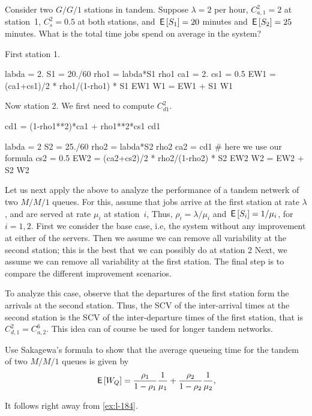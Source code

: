 \begin{exercise}
Consider two $G/G/1$ stations in tandem. Suppose $\lambda=2$ per hour, $C_{a,1}^2=2$ at station~1, $C_s^2=0.5$ at both stations, and $\,\mathsf{E}\left[S_1\right]=20$ minutes and $\,\mathsf{E}\left[S_2\right]=25$ minutes. What is the total time jobs spend on average in the system? 

\begin{solution}
First station 1.
\begin{pyconsole}
labda = 2.
S1 = 20./60
rho1 = labda*S1
rho1
ca1 = 2.
cs1 = 0.5
EW1 = (ca1+cs1)/2 * rho1/(1-rho1) * S1
EW1
W1 = EW1 + S1
W1
\end{pyconsole}

Now station 2. We first need to compute $C_{d1}^2$. 

\begin{pyconsole}
cd1 = (1-rho1**2)*ca1 + rho1**2*cs1
cd1
\end{pyconsole}


\begin{pyconsole}
labda = 2
S2 = 25./60
rho2 = labda*S2
rho2
ca2 = cd1 # here we use our formula
cs2 = 0.5
EW2 = (ca2+cs2)/2 * rho2/(1-rho2) * S2
EW2
W2 = EW2 + S2
W2
\end{pyconsole}


\end{solution}
\end{exercise}




Let us next  apply the above to analyze the performance of a tandem netwerk of two $M/M/1$ queues.
For this, assume that jobs arrive at the first station at rate $\lambda$, and are served at rate $\mu_i$ at station~$i$, Thus, $\rho_i = \lambda/\mu_i$ and $\,\mathsf{E}\left[S_i\right] = 1/\mu_i$, for $i=1,2$.
First we consider the base case, i.e, the system without any improvement at either of the servers.
Then we assume we can remove all variability at the second station; this is the best that we can possibly do at station 2 Next, we assume we can remove all variability at the first station.
The final step is to compare the different improvement scenarios.

To analyze this case, observe that the departures of the first station form the arrivals at the second station.
Thus, the SCV of the inter-arrival times at the second station is the SCV of the inter-departure times of the first station, that is $C_{d,1}^2 = C_{a,2}^6$.
This idea can of course be used for longer tandem networks.



\begin{exercise}
Use Sakagewa's formula to show that the average queueing time for the tandem of two $M/M/1$ queues is given by
\begin{equation}
\,\mathsf{E}\left[W_Q\right] = \frac{\rho_1}{1-\rho_1} \frac1{\mu_1} + \frac{\rho_2}{1-\rho_2} \frac1{\mu_2},
\end{equation}
\begin{solution}
It follows right away from \cref{ex:l-184}.
\end{solution}
\end{exercise}


